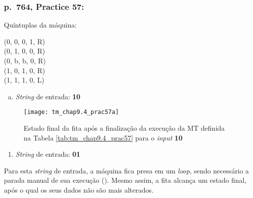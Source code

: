 \subsubsection*{p.\ 764, Practice 57:}

\begin{table}[H]
    \begin{minipage}{.5\linewidth}
        \begin{flushright}
            Quíntuplas da máquina:\hspace*{2ex}    %
        \end{flushright}
    \end{minipage}%
    \begin{minipage}{.5\linewidth}
        \begin{flushleft}
            \ttfamily
            (0, 0, 0, 1, R) \\
            (0, 1, 0, 0, R) \\
            (0, b, b, 0, R) \\
            (1, 0, 1, 0, R) \\
            (1, 1, 1, 0, L)
        \end{flushleft}
    \end{minipage}

    \caption{\cite[p.\ 764, Practice 57]{judith}}
    \label{tab:tm_chap9.4_prac57}
\end{table}

\begin{enumerate}[a.]
    \item \textit{String} de entrada: \textbf{10}
\end{enumerate}

\begin{figure}[H]
    \centering
    \texttt{[image: tm\_chap9.4\_prac57a]}
    \caption{
        Estado final da fita após a finalização da execução da MT definida na
        Tabela \ref{tab:tm_chap9.4_prac57} para o \textit{input} \textbf{10}
    }
    \label{fig:tm_chap9.4_prac57a}
\end{figure}

\begin{enumerate}[resume*]
    \item \textit{String} de entrada: \textbf{01}
\end{enumerate}

Para esta \textit{string} de entrada, a máquina fica presa em um \textit{loop},
sendo necessário a parada manual de sua execução (). Mesmo assim,
a fita alcança um estado final, após o qual os seus dados não são mais
alterados.

